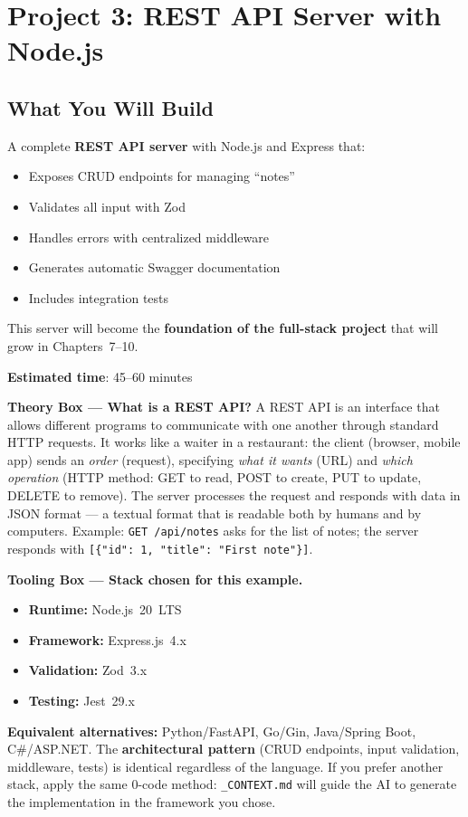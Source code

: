 \chapter{Project 3: REST API Server with Node.js}

\section*{What You Will Build}
A complete \textbf{REST API server} with Node.js and Express that:
\begin{itemize}
  \item Exposes CRUD endpoints for managing ``notes''
  \item Validates all input with Zod
  \item Handles errors with centralized middleware
  \item Generates automatic Swagger documentation
  \item Includes integration tests
\end{itemize}

This server will become the \textbf{foundation of the full-stack project} that will grow in Chapters~7--10.

\textbf{Estimated time}: 45--60 minutes

\begin{notebox}
\textbf{Theory Box --- What is a REST API?} A REST API is an interface that allows different programs to communicate with one another through standard HTTP requests. It works like a waiter in a restaurant: the client (browser, mobile app) sends an \textit{order} (request), specifying \textit{what it wants} (URL) and \textit{which operation} (HTTP method: GET to read, POST to create, PUT to update, DELETE to remove). The server processes the request and responds with data in JSON format --- a textual format that is readable both by humans and by computers. Example: \texttt{GET /api/notes} asks for the list of notes; the server responds with \texttt{[\{"id": 1, "title": "First note"\}]}.
\end{notebox}

\begin{notebox}
\textbf{Tooling Box --- Stack chosen for this example.}
\begin{itemize}
  \item \textbf{Runtime:} Node.js~20~LTS
  \item \textbf{Framework:} Express.js~4.x
  \item \textbf{Validation:} Zod~3.x
  \item \textbf{Testing:} Jest~29.x
\end{itemize}
\textbf{Equivalent alternatives:} Python/FastAPI, Go/Gin, Java/Spring Boot, C\#/ASP.NET. The \textbf{architectural pattern} (CRUD endpoints, input validation, middleware, tests) is identical regardless of the language. If you prefer another stack, apply the same 0-code method: \texttt{\_CONTEXT.md} will guide the AI to generate the implementation in the framework you chose.
\end{notebox}

